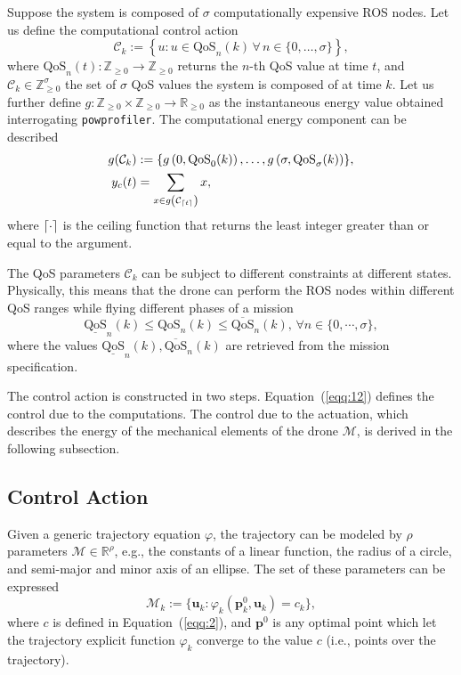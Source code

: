 \documentclass[letterpaper,10pt,conference]{ieeeconf}
\newcommand{\stt}[1]{{\small\tt #1}} %
\newcommand{\powprof}{\stt{powprofiler}}
\DeclarePairedDelimiter{\ceil}{\lceil}{\rceil}
\begin{document}
Suppose the system is composed of $\sigma$ computationally expensive ROS nodes. Let us define the computational control action
\begin{equation}\label{eqq:12}
  \mathcal{C}_k:=\left\{u:u\in\text{QoS}_n(k)\,\forall\,n\in\{0,\dots,\sigma\}\right\},
\end{equation}
where $\text{QoS}_n(t):\mathbb{Z}_{\geq 0}\rightarrow\mathbb{Z}_{\geq 0}$ returns the $n$-th QoS value at time $t$, and $\mathcal{C}_k\in\mathbb{Z}_{\geq 0}^\sigma$ the set of $\sigma$ QoS values the system is composed of at time $k$. Let us further define $g:\mathbb{Z}_{\geq 0}\times\mathbb{Z}_{\geq 0}\rightarrow\mathbb{R}_{\geq 0}$ as the instantaneous energy value obtained interrogating \powprof{}. The computational energy component can be described
\begin{equation}\begin{split}
  g(\mathcal{C}_{k})&:=\{g\left(0,\text{QoS}_0(k)\right),\dots,g\left(\sigma,\text{QoS}_\sigma(k)\right)\},\\
  y_c(t)&=\sum_{x\in g\left(\mathcal{C}_{\ceil{t}}\right)}{x},
\end{split}\end{equation}
where $\ceil{\cdot}$ is the ceiling function that returns the least integer greater than or equal to the argument.

The QoS parameters $\mathcal{C}_k$ can be subject to different constraints at different states. Physically, this means that the drone can perform the ROS nodes within different QoS ranges while flying different phases of a mission
\begin{equation}\label{eqq:14}
  \underline{\text{QoS}}_n(k)\leq \text{QoS}_n(k)\leq \overline{\text{QoS}}_n(k),\,\forall n\in\{0,\cdots,\sigma\},
\end{equation}
where the values $\underline{\text{QoS}}_n(k),\overline{\text{QoS}}_n(k)$ are retrieved from the mission specification.

The control action is constructed in two steps. Equation~(\ref{eqq:12}) defines the control due to the computations. The control due to the actuation, which describes the energy of the mechanical elements of the drone $\mathcal{M}$, is derived in the following subsection.

\subsection{Control Action}

Given a generic trajectory equation $\varphi$, the trajectory can be modeled by $\rho$ parameters $\mathcal{M}\in\mathbb{R}^\rho$, e.g., the constants of a linear function, the radius of a circle, and semi-major and minor axis of an ellipse. The set of these parameters can be expressed
\begin{equation}\label{eqq:14}
  \mathcal{M}_k:=\{\mathbf{u}_k : \varphi_k(\mathbf{p}_k^0,\mathbf{u}_k)=c_k\},
\end{equation}
where $c$ is defined in Equation~(\ref{eqq:2}), and $\mathbf{p}^0$ is any optimal point which let the trajectory explicit function $\varphi_k$ converge to the value $c$ (i.e., points over the trajectory). 
\end{document}
